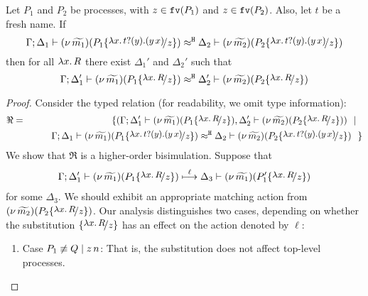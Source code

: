 \begin{lemma}
	\label{lem:process_subst}
	Let $P_1$ and $P_2$ be processes, with $z \in \mathtt{fv}(P_1)$ and $z \in \mathtt{fv}(P_2)$.
	Also, let $t$ be a fresh name.
	If
	\[
		\horel{\Gamma}{\Delta_1}{\newsp{\widetilde{m_1}}{P_1 \subst{\trvalx{t}}{z} }}
		{\hwb}
		{\Delta_2}{\newsp{\widetilde{m_2}}{P_2 \subst{\trvalx{t}}{z} }}
	\]
	then for all $\lambda x.\,R$ there exist  $\Delta_1'$ and $\Delta_2'$ such that
	\[
		\horel{\Gamma}{\Delta_1'}{\newsp{\widetilde{m_1}}{P_1 \subst{{\abs{x}{R}}}{z} }}
		{\hwb}
		{\Delta_2'}{\newsp{\widetilde{m_2}}{P_2 \subst{{\abs{x}{R}}}{z} }}
	\]
\end{lemma}


\begin{proof}
	Consider the typed relation (for readability, we omit type information):
	\begin{eqnarray*}
		\Re	&=&	\set{
					(\Gamma; \Delta_1' \proves \newsp{\widetilde{m_1}}{P_1 \subst{{\abs{x}{R}}}{z}}, \Delta_2' \proves \newsp{\widetilde{m_2}}{P_2 \subst{{\abs{x}{R}}}{z}})
					\setbar\\
			&&		\qquad \horel{\Gamma}{\Delta_1}{\newsp{\widetilde{m_1}}{P_1 \subst{\trvalx{t}}{z} }}
					{\hwb}
					{\Delta_2}{\newsp{\widetilde{m_2}}{P_2 \subst{\trvalx{t}}{z} }}~~}
	\end{eqnarray*}
	We show that $\Re$ is a higher-order bisimulation. Suppose that 
	\begin{eqnarray}
		\horel{\Gamma}{\Delta_1'}{\newsp{\widetilde{m_1}}{P_1 \subst{{\abs{x}{R}}}{z} }}
		{\hby{\ell}}
		{\Delta_3}{\newsp{\widetilde{m_1}}{P_1' \subst{{\abs{x}{R}}}{z} }}
		\label{lem:proc_subst1}
	\end{eqnarray}
	for some $\Delta_3$.
   We should exhibit an appropriate matching action from $ \newsp{\widetilde{m_2}}{P_2 \subst{{\abs{x}{R}}}{z}}$.
	Our analysis distinguishes two cases, depending on whether the
	substitution $\subst{{\abs{x}{R}}}{z}$ has an effect on the action denoted by $\ell$:
	\begin{enumerate}
		\item	Case $P_1 \not\equiv Q \;|\; z\, {n}$: That is,
				the substitution does not affect top-level processes. 


\end{enumerate}
\end{proof}
